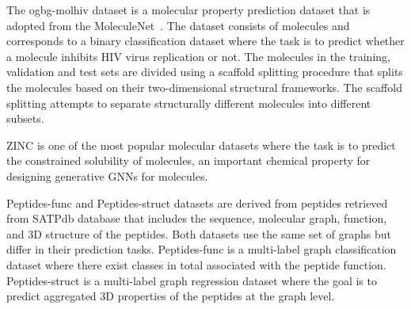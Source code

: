 \documentclass{article}
\theoremstyle{plain}
\theoremstyle{definition}
\theoremstyle{remark}
\begin{document}
The ogbg-molhiv dataset is a molecular property prediction dataset that is adopted from the MoleculeNet~\cite{wu2018moleculenet}.
The dataset consists of  molecules and corresponds to a binary classification dataset where the task is to predict whether a molecule inhibits HIV virus replication or not.
The molecules in the training, validation and test sets are divided using a scaffold splitting procedure that splits the molecules based on their two-dimensional structural frameworks.
The scaffold splitting attempts to separate structurally different molecules into different subsets.

ZINC is one of the most popular molecular datasets where the task is to predict the constrained solubility of molecules, an important chemical property for designing generative GNNs for molecules.

Peptides-func and Peptides-struct datasets are derived from  peptides retrieved from SATPdb database that includes the
sequence, molecular graph, function, and 3D structure of the
peptides.
Both datasets use the same set of graphs but differ in their prediction tasks.
Peptides-func is a multi-label graph classification dataset where there exist  classes in total associated with the peptide function.
Peptides-struct is a multi-label graph regression dataset where the goal is to predict aggregated 3D properties of the peptides at the graph level.
\end{document}
